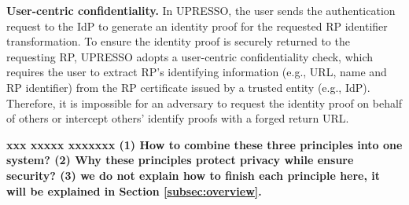 
\vspace{1mm}\noindent \textbf{User-centric confidentiality.}
In UPRESSO, the user sends the authentication request to the IdP to generate an identity proof for the requested RP identifier transformation. To ensure the identity proof is securely returned to the requesting RP, UPRESSO adopts a user-centric confidentiality check, which requires the user to extract RP's identifying information (e.g., URL, name and RP identifier) from the RP certificate issued by a trusted entity (e.g., IdP). Therefore, it is impossible for an adversary to request the identity proof on behalf of others or intercept others' identify proofs with a forged return URL.

\vspace{1mm} \textbf{xxx xxxxx xxxxxxx
(1) How to combine these three principles into one system?
(2) Why these principles protect privacy while ensure security?
(3) we do not explain how to finish each principle here, it will be explained in Section \ref{subsec:overview}.}
 
\begin{comment}
Instead of relying on the check at the IdP, the confidentiality is ensured by a user-side check based on the trusted information extracted from the RP certificate.
In UPRESSO, a certificate is issued for each RP by a trusted entity (e.g., IdP) to protect the identifying information of the RP (e.g., URL, name and RP identifier) with a signature from the trusted entity to avoid the modification and forging.
The user transmits IdP the request with the correct RP identifier  transformation for generating identity proof; and sends the proof to the URL specified in the RP certificate.
\end{comment}



